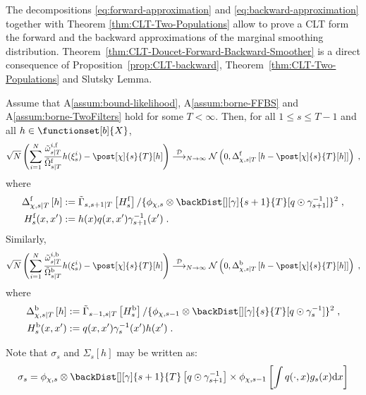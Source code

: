 The decompositions \eqref{eq:forward-approximation} and \eqref{eq:backward-approximation} together with Theorem \ref{thm:CLT-Two-Populations} allow to prove a CLT form the forward and the backward
approximations of the marginal smoothing distribution. Theorem~\ref{thm:CLT-Doucet-Forward-Backward-Smoother} is a direct consequence of Proposition~\ref{prop:CLT-backward}, Theorem~\ref{thm:CLT-Two-Populations} and Slutsky Lemma.
\begin{thm}
\label{thm:CLT-Doucet-Forward-Backward-Smoother}
Assume that A\ref{assum:bound-likelihood}, A\ref{assum:borne-FFBS} and A\ref{assum:borne-TwoFilters} hold for some $T<\infty$. Then, for all $1 \leq s \leq T-1$ and all $h \in \functionset[b]{X}$,
\begin{equation*}
\sqrt{N}\left( \sum_{i=1}^N \frac{\smwght{s}{T}{i, \mathrm{f}}}{\tilde{\Omega}^{\mathrm{f}}_{s|T}} h(\epart{s}{i}) - \post[\Xinit]{s}{T}[h]
\right) \dlim_{N \to \infty} \mathcal{N}\left(0,\asymVarDoucet[\Xinit]{\forward}{s}{T}{h- \post[\Xinit]{s}{T}[h]} \right)\eqsp,
\end{equation*}
where
\begin{align*}
\asymVarDoucet[\Xinit]{\forward}{s}{T}{h} &\eqdef \asymVarJoint{s,s+1}{T}{H^{\forward}_s} /\{ \filt{\Xinit,s} \otimes \backDist[][\gamma]{s+1}{T}[q \odot \fakeprior_{s+1}^{-1}] \}^2\eqsp,\\
H^{\forward}_s (x,x') &\eqdef h(x) q(x,x') \fakeprior_{s+1}^{-1}(x')\eqsp.
\end{align*}
Similarly,
\begin{equation*}
\sqrt{N}\left( \sum_{i=1}^N \frac{\smwght{s}{T}{i, \mathrm{b}}}{\tilde{\Omega}^{\mathrm{b}}_{s|T}} h(\epart{s}{i}) - \post[\Xinit]{s}{T}[h]
\right)
\dlim_{N \to \infty} \mathcal{N}\left(0, \asymVarDoucet[\Xinit]{\backward}{s}{T}{h- \post[\Xinit]{s}{T}[h]}\right)\eqsp,
\end{equation*}
where
\begin{align*}
\asymVarDoucet[\Xinit]{\backward}{s}{T}{h} &\eqdef \asymVarJoint{s-1,s}{T}{H_s^{\backward} }/\{ \filt{\Xinit,s-1} \otimes \backDist[][\gamma]{s}{T}[q \odot \fakeprior_s^{-1}] \}^2\eqsp,\\
H_s^{\backward} (x,x') &\eqdef  q(x,x') \fakeprior_s^{-1}(x')h(x')\eqsp.
\end{align*}
\end{thm}
Note that $\sigma_s$ and $\Sigma_s[h]$ may be written as:
\[
\sigma_s = \filt{\Xinit,s} \otimes \backDist[][\gamma]{s+1}{T} \left[q\odot \fakeprior_{s+1}^{-1} \right]\times \filt{\Xinit,s-1}\left[ \int  q(\cdot,x) g_s(x) \rmd x\right]
\]
